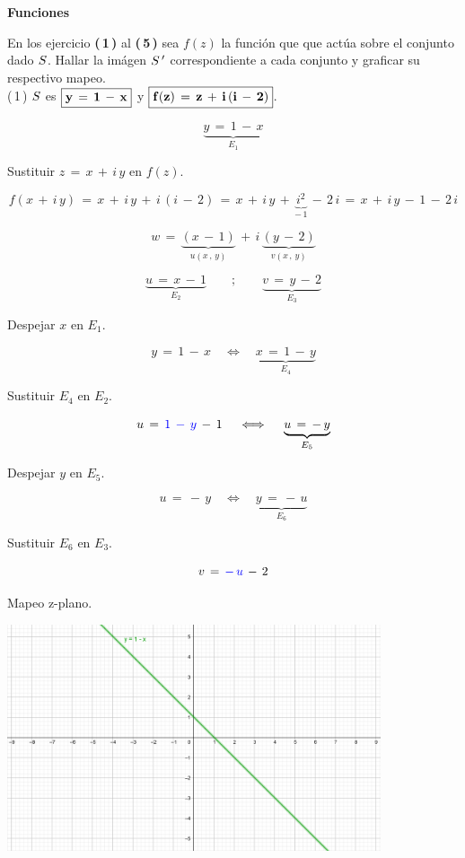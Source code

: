 \documentclass[a4paper,11pt,openany]{book}
\begin{document}
\newpage


\graphicspath{ {images/} }

\begin{center}
\textbf{Funciones}
\end{center}

En los ejercicio \textbf{(\,1\,)} al \textbf{(\,5\,)} sea $f(z)$ la función que que actúa sobre el conjunto dado $\mathnormal{S}$. Hallar la imágen $\mathnormal{S\,'}$ correspondiente a cada conjunto y graficar su respectivo mapeo.\\

\textcolor{ao(english)}{(\,1\,)} $\mathnormal{S}$ es $\boxed{\bf{y\,=\,1\,-\,x}}$ y $\boxed{\bf{f(z)\,=\,z\,+\,i\,(i\,-\,2)}}$.


$$\underbrace{y\,=\,1\,-\,x}_{E_{1}}$$

\textcolor{ao(english)}{} Sustituir $z\,=\,x\,+\,i\,y$ en $f(z)$.

$$f(x\,+\,i\,y)\,=\,x\,+\,i\,y\,+\,i\,(i\,-\,2)\,=\,x\,+\,i\,y\,+\,\underbrace{i^{2}}_{-\,1}\,-\,2\,i\,=\,x\,+\,i\,y\,-\,1\,-\,2\,i$$

$$w\,=\,\underbrace{(x\,-\,1)}_{u(x\,,\,y)}\,+\,i\,\underbrace{(y\,-\,2)}_{v(x\,,\,y)}$$

$$\underbrace{u\,=\,x\,-\,1}_{E_{2}} \qquad;\qquad \underbrace{v\,=\,y\,-\,2}_{E_{3}}$$

\textcolor{ao(english)}{} Despejar $x$ en $E_{1}$.

$$y\,=\,1\,-\,x \quad\iff\quad \underbrace{x\,=\,1\,-\,y}_{E_{4}}$$

\textcolor{ao(english)}{} Sustituir $E_{4}$ en $E_{2}$.

$$u\,=\,\textcolor{ao}{1\,-\,y}\,-\,1 \quad\iff\quad \underbrace{u\,=\,-\,y}_{E_{5}}$$

\textcolor{ao(english)}{} Despejar $y$ en $E_{5}$.

$$u\,=\,-\,y \quad\iff\quad \underbrace{y\,=\,-\,u}_{E_{6}}$$

\textcolor{ao(english)}{} Sustituir $E_{6}$ en $E_{3}$.

$$v\,=\,\textcolor{ao}{-\,u}\,-\,2$$

\textcolor{ao(english)}{} Mapeo z-plano.

\begin{center}
     \includegraphics[width=11cm]{Mapeo Ej 1 z.png}
\end{center}
\end{document}
